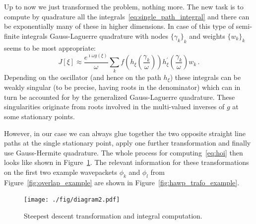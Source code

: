 \documentclass[a4paper,10pt]{article}
\begin{document}
Up to now we just transformed the problem, nothing more. The new task is to
compute by quadrature all the integrals~\eqref{eq:single_path_integral} and
there can be exponentially many of these in higher dimensions. In case of this type of
semi-finite integrals Gauss-Laguerre quadrature with nodes ${\{\gamma_k\}}_{k}$
and weights ${\{w_k\}}_{k}$ seems to be most appropriate:
\begin{equation}
  J[\xi] \approx \frac{e^{\imath \omega g(\xi)}}{\omega}
                 \sum_{k}
                   f\left(h_{\xi}\left(\frac{\gamma_k}{\omega}\right)\right)
                   h_{\xi}^{\prime}\left(\frac{\gamma_k}{\omega}\right)
                   w_k \,.
\end{equation}
Depending on the oscillator (and hence on the path $h_{\xi}$) these integrals can be
weakly singular (to be precise, having roots in the denominator) which can in turn
be accounted for by the generalized Gauss-Laguerre quadrature. These singularities
originate from roots involved in the multi-valued inverses of $g$ at some stationary
points.

However, in our case we can always glue together the two opposite
straight line paths at the single stationary point, apply one further transformation and
finally use Gauss-Hermite quadrature. The whole process for computing~\eqref{eq:hoi}
then looks like shown in Figure~\ref{fig:transformation_chain_2}. The relevant information for these
transformations on the first two example wavepackets $\phi_k$ and $\phi_l$ from
Figure~\ref{fig:overlap_example} are shown in Figure~\ref{fig:hawp_trafo_example}.

\begin{figure}
  \centering
  \texttt{[image: ./fig/diagram2.pdf]}
  \caption{Steepest descent transformation and integral computation.}
  \label{fig:transformation_chain_2}
\end{figure}
\end{document}
